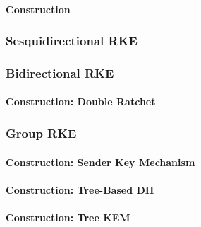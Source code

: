 \documentclass[a4paper,orivec]{llncs}
\begin{document}
\paragraph{Construction}

\subsubsection{Sesquidirectional RKE}

\subsubsection{Bidirectional RKE}

\paragraph{Construction: Double Ratchet}

\subsubsection{Group RKE}

\paragraph{Construction: Sender Key Mechanism}

\paragraph{Construction: Tree-Based DH}

\paragraph{Construction: Tree KEM}


\end{document}
